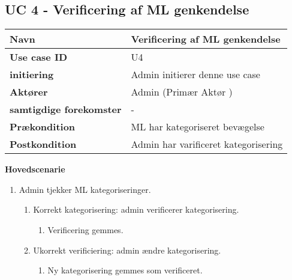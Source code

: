 \subsection{UC 4 - Verificering af ML genkendelse}
\begin{table}[htbp] 
	\begin{tabular}{|p{5cm}|p{9cm}|}
		\hline
		\textbf{Navn} & Verificering af ML genkendelse \\ \hline
		\textbf{Use case ID} & U4 \\ \hline
		\textbf{initiering} & Admin initierer denne use case \\ \hline
		\textbf{Aktører} & Admin (Primær Aktør ) \\ \hline
		\textbf{samtigdige forekomster} & - \\ \hline
		\textbf{Prækondition} & ML har kategoriseret bevægelse \\ \hline
		\textbf{Postkondition} & Admin har varificeret kategorisering  \\ \hline
	\end{tabular}
\end{table}
\textbf{Hovedscenarie}
\begin{enumerate}
	\item Admin tjekker ML kategoriseringer.
	\begin{enumerate}
		\item Korrekt kategorisering: admin verificerer kategorisering.
		\begin{enumerate}
			\item Verificering gemmes.
		\end{enumerate}
		\item Ukorrekt verificiering: admin ændre kategorisering.
		\begin{enumerate}
			\item Ny kategorisering gemmes som verificeret.
		\end{enumerate}
	\end{enumerate}
\end{enumerate}

\clearpage
